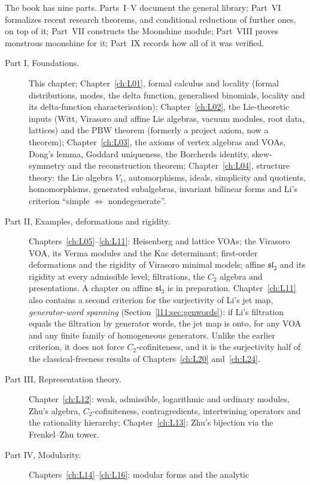 The book has nine parts. Parts~I--V document the general library; Part~VI formalizes recent research
theorems, and conditional reductions of further ones, on top of it; Part~VII constructs the Moonshine
module; Part~VIII proves monstrous moonshine for it; Part~IX records how all of it was verified.
\begin{description}
\item[Part I, Foundations.] This chapter; Chapter~\ref{ch:L01}, formal calculus and locality
  (formal distributions, modes, the delta function, generalised binomials, locality and its
  delta-function characterisation); Chapter~\ref{ch:L02}, the Lie-theoretic inputs (Witt, Virasoro
  and affine Lie algebras, vacuum modules, root data, lattices) and the PBW theorem
   (formerly a project axiom, now a theorem); Chapter~\ref{ch:L03}, the axioms of vertex algebras and VOAs, Dong's lemma,
  Goddard uniqueness, the Borcherds identity, skew-symmetry and the reconstruction theorem;
  Chapter~\ref{ch:L04}, structure theory: the Lie algebra $V_1$, automorphisms, ideals, simplicity
  and quotients, homomorphisms, generated subalgebras, invariant bilinear forms and Li's criterion
  ``simple $\iff$ nondegenerate''.
\item[Part II, Examples, deformations and rigidity.] Chapters~\ref{ch:L05}--\ref{ch:L11}: Heisenberg
  and lattice VOAs; the Virasoro VOA, its Verma modules and the Kac determinant; first-order
  deformations and the rigidity of Virasoro minimal models; affine $\mathfrak{sl}_2$ and its rigidity
  at every admissible level; filtrations, the $C_2$ algebra and presentations. A chapter on
  affine $\mathfrak{sl}_3$ is in preparation. Chapter~\ref{ch:L11} also contains a second criterion for the surjectivity of Li's
  jet map, \emph{generator-word spanning} (Section~\ref{l11:sec:genwords}): if Li's filtration equals the
  filtration by generator words, the jet map is onto, for any VOA and any finite family of homogeneous
  generators. Unlike the earlier criterion, it does not force $C_2$-cofiniteness, and it is the
  surjectivity half of the classical-freeness results of Chapters~\ref{ch:L20} and~\ref{ch:L24}.
\item[Part III, Representation theory.] Chapter~\ref{ch:L12}: weak, admissible, logarithmic and
  ordinary modules, Zhu's algebra, $C_2$-cofiniteness, contragredients, intertwining operators and
  the rationality hierarchy; Chapter~\ref{ch:L13}: Zhu's bijection via the Frenkel--Zhu tower.
\item[Part IV, Modularity.] Chapters~\ref{ch:L14}--\ref{ch:L16}: modular forms and the analytic

\end{description}
